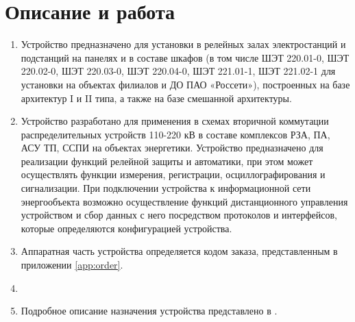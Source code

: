 \color{unidarkgreen}\section[Описание и работа]{Описание и работа}
\color{black}

\color{black}

\begin{enumerate}[label=\arabic{section}.\arabic{subsection}.\arabic*, labelsep=4pt, leftmargin=0pt, itemindent=57pt]

\item
Устройство предназначено для установки в релейных залах электростанций и подстанций на панелях и в составе шкафов (в том числе ШЭТ 220.01-0, ШЭТ 220.02-0, ШЭТ 220.03-0, ШЭТ 220.04-0, ШЭТ 221.01-1, ШЭТ 221.02-1 для установки на объектах филиалов и ДО ПАО «Россети»), построенных на базе архитектур I и II типа, а также на базе смешанной архитектуры.
\item
Устройство разработано для применения в схемах вторичной коммутации распределительных устройств 110-220 кВ в составе комплексов РЗА, ПА, АСУ ТП, ССПИ на объектах энергетики.
Устройство предназначено для реализации функций релейной защиты и автоматики, при этом может осуществлять функции измерения, регистрации, осциллографирования и сигнализации.
При подключении устройства к информационной сети энергообъекта возможно осуществление функций дистанционного управления устройством и сбор данных с него посредством протоколов и интерфейсов, которые определяются конфигурацией устройства.

\item 
Аппаратная часть устройства определяется кодом заказа, представленным в приложении \ref{app:order}.

\item
{}

\item
Подробное описание назначения устройства представлено в \ManualUnitGeneral.

\end{enumerate}

